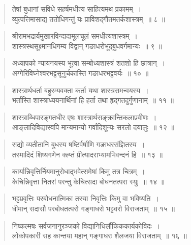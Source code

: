 \begin{verse}
तेषां बुधानां सविधे सहर्षमधीत्य साहित्यमथ प्रकामम्~।\\
व्युत्पत्तिमासाद्य ततोधिगन्तुं यः प्राविशद्गौतमतर्कशास्त्रम्~॥ ८ ॥
\end{verse}

\begin{verse}
श्रीरामभद्रार्यमुखारविन्दादामूलचूलं समधीत्यशास्त्रम्~।\\
शास्त्रस्थसूक्ष्मानधिगम्य विद्वान् गङाधरोभूद्बुधवर्गमान्यः~॥ ९ ॥
\end{verse}

\begin{verse}
अध्यापको न्यायनयस्य भूत्वा सम्बोध्यशास्त्रं शतशो हि छात्रान्~।\\
अग्गेरिविघ्नेश्वरभट्टसूनुर्चकास्ति गङाधरभट्टवर्यः~॥ १० ॥
\end{verse}

\begin{verse}
शास्त्रार्थधर्ता बहुरम्यवक्ता कर्ता यथा शास्त्रसमन्वयस्य~।\\
भर्तास्ति शास्त्राध्ययनार्थिनां हि हर्ता तथा हृद्गतदुर्गुणानाम्~॥ ११ ॥
\end{verse}

\begin{verse}
शास्त्राब्धिपारङ्गतधीर एषः शास्त्रार्थसङ्क्रान्तिकलाप्रवीणः~।\\
आङ्लादिविद्यास्वपि मान्यमान्यो गर्वादिशून्यः सरलो दयालुः~॥ १२ ॥
\end{verse}

\begin{verse}
सद्यो व्यतीतानि बुधस्य षष्टिर्वर्षाणि गङाधरसंज्ञितस्य~।\\
तस्मादिदं शिष्यगणेन क्ल्प्तं प्रीत्यादराभ्यामभिवन्दनं हि~॥ १३ ॥
\end{verse}

\begin{verse}
कार्यान्निवृत्तिर्नियमानुरोधाद्भवेत्समेषां किमु तत्र चित्रम्~।\\
केचिन्निवृत्ता नितरां परन्तु केचित्सदा बोधनतत्परा स्युः~॥ १४ ॥
\end{verse}

\begin{verse}
भट्टप्रवृत्तिः परबोधनात्मिका तस्या निवृत्तिः किमु वा भविष्यति~।\\
धीमान् सदासौ परबोधतत्परो गङ्गाधरो भट्टवरो विराजताम्~॥ १५ ॥
\end{verse}

\begin{verse}
निष्कल्मषः सर्वजनानुरञ्जको विद्यानिधिर्लौकिककार्यकोविदः~।\\
लोकोपकारी सह कान्तया महान् गङ्गाधरः शैलजया विराजताम्~॥ १६ ॥
\end{verse}

